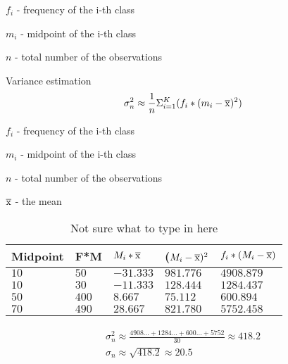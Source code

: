 \documentclass{article}
\begin{document}
$f_i$ - frequency of the i-th class

$m_i$ - midpoint of the i-th class

$n$ - total number of the observations

Variance estimation
\begin{equation}
  \sigma^2_n \approx \frac{1}{n}\Sigma^K_{i=1}(f_i * (m_i - \overline{\rm x})^2)
\end{equation}

$f_i$ - frequency of the i-th class

$m_i$ - midpoint of the i-th class

$n$ - total number of the observations

$\overline{\rm x}$ - the mean

\begin{table}[htbp]
\centering
\begin{tabular}{|l|l|l|l|l|}
\hline
\textbf{Midpoint} & \textbf{F*M} & \textbf{$M_i * \overline{\rm x}$} & \textbf{($M_i - \overline{\rm x})^2$} & \textbf{$f_i * (M_i - \overline{\rm x})$} \\
\hline
$10$ & $50$ & $-31.333$ & $981.776$ & $4908.879$ \\
\hline
$10$ & $30$ & $-11.333$ & $128.444$ & $1284.437$ \\
\hline
$50$ & $400$ & $8.667$ & $75.112$ & $600.894$ \\
\hline
$70$ & $490$ & $28.667$ & $821.780$ & $5752.458$  \\
\hline
\end{tabular}
\caption{Not sure what to type in here}
\label{tab:estimating_a_mean_and_variance_3}
\end{table}
\begin{equation}
  \begin{gathered}
    \sigma^2_n \approx \frac{4908... + 1284... + 600... + 5752}{30} \approx 418.2  \\
    \sigma_n \approx \sqrt{418.2} \approx 20.5
  \end{gathered}
\end{equation}
\end{document}
